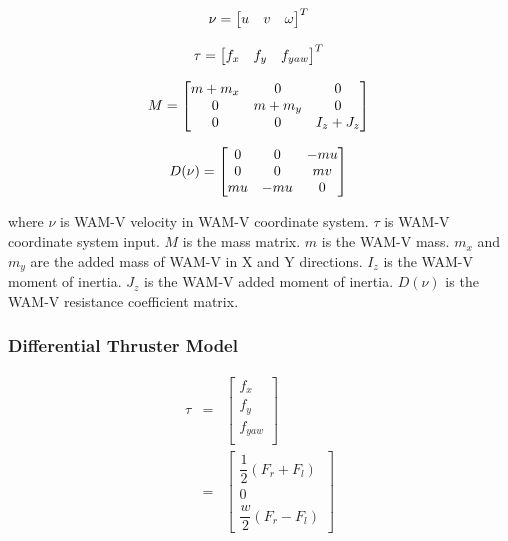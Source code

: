 \documentclass[lettersize,journal]{IEEEtran}
\begin{document}
\begin{equation}
  \nu = 
  \begin{bmatrix}
  u & v & \omega \\
  \end{bmatrix}^T\\
  \label{eq:control_1}
\end{equation}

\begin{equation}
\tau = 
\begin{bmatrix}
f_x & f_y & f_{yaw} \\
\end{bmatrix}^T\\
\end{equation}

\begin{equation}
M = 
\begin{bmatrix}
m+m_x &  0 & 0 \\
0 & m+m_y & 0 \\
0 & 0 & I_z + J_z
\end{bmatrix}\\
\end{equation}

\begin{equation}
D(\nu) = 
\begin{bmatrix}
0 & 0 & -mu \\
0 & 0 & mv \\
mu & -mu & 0
\end{bmatrix}\\
\end{equation}

where $\nu$ is WAM-V velocity in WAM-V coordinate system.
$\tau$ is WAM-V coordinate system input.
$M$ is the mass matrix.
$m$ is the WAM-V mass.
$m_x$ and $m_y$ are the added mass of WAM-V in X and Y directions.
$I_z$ is the WAM-V moment of inertia.
$J_z$ is the WAM-V added moment of inertia.
$D(\nu)$ is the WAM-V resistance coefficient matrix.

\subsubsection{Differential Thruster Model}
\begin{eqnarray}
\tau &=& 
\begin{bmatrix}
f_x \\ 
f_y \\
f_{yaw} \\
\end{bmatrix}\nonumber  \\
&=&
\begin{bmatrix}
\dfrac{1}{2}(F_r + F_l) \\
0 \\
\dfrac{w}{2}(F_r - F_l) 
\end{bmatrix} \\
\nonumber  
\end{eqnarray}
\end{document}
